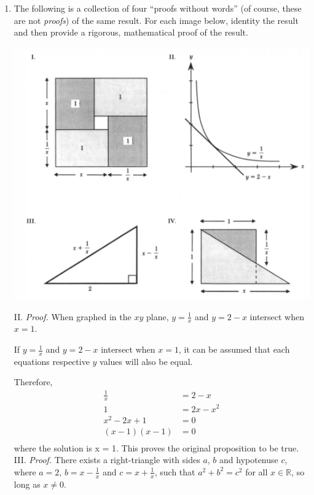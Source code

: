 \documentclass[12pt]{article}
\begin{document}
\begin{enumerate}
\item The following is a collection of four ``proofs without words'' (of course, these are not \emph{proofs}) of the same result. For each image below, identity the result and then provide a rigorous, mathematical proof of the result.
\begin{center}
\includegraphics[scale=0.4]{pww_1.jpg}
\end{center}
II. \emph{Proof.} When graphed in the $xy$ plane, $y=\frac{1}{x}$ and $y=2-x$ intersect when $x=1$.

If $y=\frac{1}{x}$ and $y=2-x$ intersect when $x=1$, it can be assumed that each equations respective $y$ values will also be equal.

Therefore,
\begin{align*}
     \frac{1}{x} &= 2 - x\\
               1 &= 2x - x^2\\
    x^2 - 2x + 1 &= 0\\
  (x - 1)(x - 1) &= 0\\
\end{align*} 
where the solution is x = 1. This proves the original proposition to be true.\\

III. \emph{Proof.} There exists a right-triangle with sides $a$, $b$ and hypotenuse $c$, where $a=2$, $b=x-\frac{1}{x}$ and $c=x+\frac{1}{x}$, such that $a^2 + b^2 = c^2$ for all $x \in \mathbb R$, so long as $x \ne 0$.


\end{enumerate}
\end{document}
